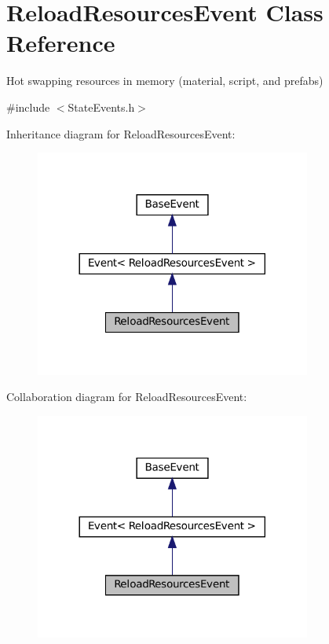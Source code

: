 \hypertarget{classReloadResourcesEvent}{}\section{Reload\+Resources\+Event Class Reference}
\label{classReloadResourcesEvent}


Hot swapping resources in memory (material, script, and prefabs)  




{\ttfamily \#include $<$State\+Events.\+h$>$}



Inheritance diagram for Reload\+Resources\+Event\+:
\nopagebreak
\begin{figure}[H]
\begin{center}
\leavevmode
\includegraphics[width=257pt]{classReloadResourcesEvent__inherit__graph}
\end{center}
\end{figure}


Collaboration diagram for Reload\+Resources\+Event\+:
\nopagebreak
\begin{figure}[H]
\begin{center}
\leavevmode
\includegraphics[width=257pt]{classReloadResourcesEvent__coll__graph}
\end{center}
\end{figure}
